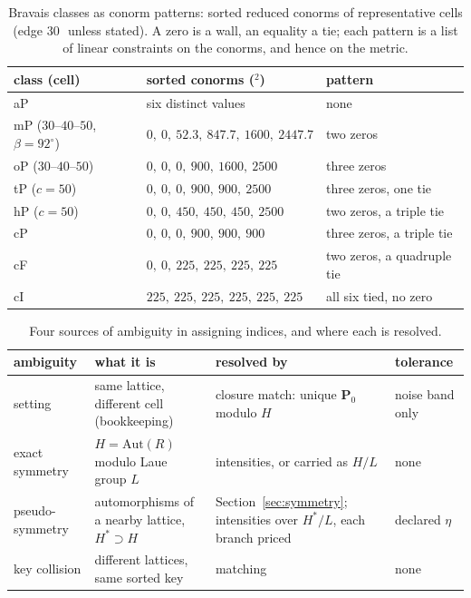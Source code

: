 \documentclass[preprint,pdf]{iucr}          %
\newcommand{\Ang}{\text{\AA}}
\newcommand{\Pop}{\mathbf{P}}
\begin{document}
\begin{table}
\caption{Bravais classes as conorm patterns: sorted reduced conorms of representative cells (edge 30\,\Ang\ unless stated). A zero is a wall, an equality a tie; each pattern is a list of linear constraints on the conorms, and hence on the metric.}
\label{tab:patterns}
\begin{footnotesize}\begin{tabular}{lll}
class (cell) & sorted conorms (\Ang$^2$) & pattern \\
\hline
aP & six distinct values & none \\
mP ($30$--$40$--$50$, $\beta=92^\circ$) & $0,\ 0,\ 52.3,\ 847.7,\ 1600,\ 2447.7$ & two zeros \\
oP ($30$--$40$--$50$) & $0,\ 0,\ 0,\ 900,\ 1600,\ 2500$ & three zeros \\
tP ($c=50$) & $0,\ 0,\ 0,\ 900,\ 900,\ 2500$ & three zeros, one tie \\
hP ($c=50$) & $0,\ 0,\ 450,\ 450,\ 450,\ 2500$ & two zeros, a triple tie \\
cP & $0,\ 0,\ 0,\ 900,\ 900,\ 900$ & three zeros, a triple tie \\
cF & $0,\ 0,\ 225,\ 225,\ 225,\ 225$ & two zeros, a quadruple tie \\
cI & $225,\ 225,\ 225,\ 225,\ 225,\ 225$ & all six tied, no zero \\
\end{tabular}\end{footnotesize}
\end{table}

\begin{table}
\caption{Four sources of ambiguity in assigning indices, and where each is resolved.}
\label{tab:ambiguity}
\begin{small}\begin{tabular}{p{2.1cm}p{3.6cm}p{4.2cm}p{2.1cm}}
ambiguity & what it is & resolved by & tolerance \\
\hline
setting & same lattice, different cell (bookkeeping) & closure match: unique $\Pop_0$ modulo $H$ & noise band only \\
exact symmetry & $H=\mathrm{Aut}(R)$ modulo Laue group $L$ & intensities, or carried as $H/L$ & none \\
pseudo-symmetry & automorphisms of a nearby lattice, $H^*\supset H$ & Section~\ref{sec:symmetry}; intensities over $H^*/L$, each branch priced & declared $\eta$ \\
key collision & different lattices, same sorted key & matching & none \\
\end{tabular}\end{small}
\end{table}
\end{document}
